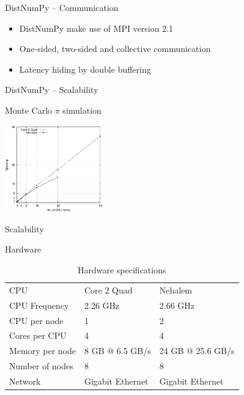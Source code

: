 \documentclass{beamer}
\begin{document}

\begin{frame}{DistNumPy -- Communication}
\begin{itemize}
  \item DistNumPy make use of MPI version 2.1
  \item One-sided, two-sided and collective communication
  \item Latency hiding by double buffering
\end{itemize}
\end{frame}


\begin{frame}{DistNumPy -- Scalability}
\begin{center}
Monte Carlo $\pi$ simulation

\vspace{10px}
\includegraphics[width=160px]{../gfx/MonteCarloStrong}
\end{center}

\end{frame}


\begin{frame}{Scalability}
\begin{center}
Hardware\vspace{15px}
\end{center}

\begin{table}
\caption{Hardware specifications}
\centering
\begin{tabular}{|lll|}
\hline
CPU & Core 2 Quad & Nehalem\\
CPU Frequency & 2.26 GHz & 2.66 GHz\\
CPU per node & 1 & 2\\
Cores per CPU & 4 & 4\\
Memory per node & 8 GB @ 6.5 GB/s & 24 GB @ 25.6 GB/s\\
Number of nodes & 8 & 8\\
Network & Gigabit Ethernet & Gigabit Ethernet\\
\hline
\end{tabular}
\label{tab:specs}
\end{table}

\end{frame}
\end{document}
